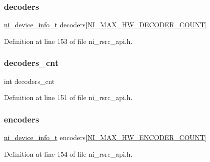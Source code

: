 \subsubsection{\texorpdfstring{decoders}{decoders}}
{\footnotesize\ttfamily \mbox{\hyperlink{ni__rsrc__api_8h_a37a9b9f89ba495d469222af27ce3058b}{ni\+\_\+device\+\_\+info\+\_\+t}} decoders\mbox{[}\mbox{\hyperlink{ni__rsrc__api_8h_aa1598022fc5ef313306c50f901940946}{N\+I\+\_\+\+M\+A\+X\+\_\+\+H\+W\+\_\+\+D\+E\+C\+O\+D\+E\+R\+\_\+\+C\+O\+U\+NT}}\mbox{]}}



Definition at line 153 of file ni\+\_\+rsrc\+\_\+api.\+h.

\mbox{\label{struct__ni__device_a62bbd6ec5fb62969214055e648942489}} 
\subsubsection{\texorpdfstring{decoders\_cnt}{decoders\_cnt}}
{\footnotesize\ttfamily int decoders\+\_\+cnt}



Definition at line 151 of file ni\+\_\+rsrc\+\_\+api.\+h.

\mbox{\label{struct__ni__device_ab6243ce9f94426b261a2278ac07d718f}} 
\subsubsection{\texorpdfstring{encoders}{encoders}}
{\footnotesize\ttfamily \mbox{\hyperlink{ni__rsrc__api_8h_a37a9b9f89ba495d469222af27ce3058b}{ni\+\_\+device\+\_\+info\+\_\+t}} encoders\mbox{[}\mbox{\hyperlink{ni__rsrc__api_8h_a41809901a12b4be816387878e15c69f3}{N\+I\+\_\+\+M\+A\+X\+\_\+\+H\+W\+\_\+\+E\+N\+C\+O\+D\+E\+R\+\_\+\+C\+O\+U\+NT}}\mbox{]}}



Definition at line 154 of file ni\+\_\+rsrc\+\_\+api.\+h.

\mbox{\label{struct__ni__device_aec9b0224277619e9191086b0db1b11ad}} 
